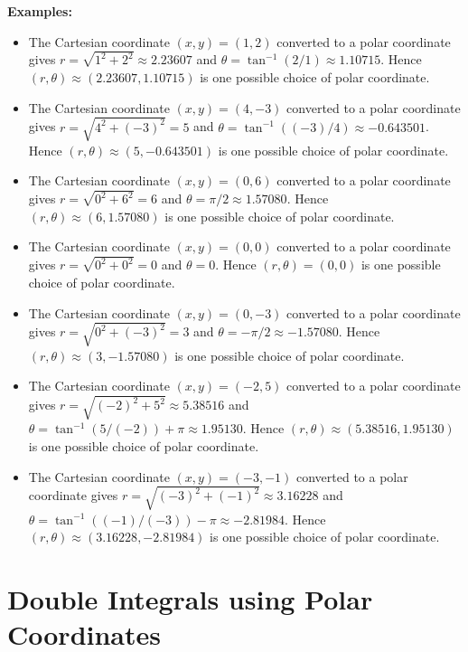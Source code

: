 \documentclass{article}
\begin{document}
\textbf{Examples:}
\begin{itemize}
\item The Cartesian coordinate \((x, y) = (1, 2)\) converted to a polar coordinate gives \(r = \sqrt{1^2 + 2^2} \approx 2.23607\) and \(\theta = \tan^{-1}(2/1) \approx 1.10715\). Hence \((r, \theta) \approx (2.23607, 1.10715)\) is one possible choice of polar coordinate. 
\item The Cartesian coordinate \((x, y) = (4, -3)\) converted to a polar coordinate gives \(r = \sqrt{4^2 + (-3)^2} = 5\) and \(\theta = \tan^{-1}((-3)/4) \approx -0.643501\). Hence \((r, \theta) \approx (5, -0.643501)\) is one possible choice of polar coordinate. 
\item The Cartesian coordinate \((x, y) = (0, 6)\) converted to a polar coordinate gives \(r = \sqrt{0^2 + 6^2} = 6\) and \(\theta = \pi/2 \approx 1.57080\). Hence \((r, \theta) \approx (6, 1.57080)\) is one possible choice of polar coordinate.  
\item The Cartesian coordinate \((x, y) = (0, 0)\) converted to a polar coordinate gives \(r = \sqrt{0^2 + 0^2} = 0\) and \(\theta = 0\). Hence \((r, \theta) = (0, 0)\) is one possible choice of polar coordinate.
\item The Cartesian coordinate \((x, y) = (0, -3)\) converted to a polar coordinate gives \(r = \sqrt{0^2 + (-3)^2} = 3\) and \(\theta = -\pi/2 \approx -1.57080\). Hence \((r, \theta) \approx (3, -1.57080)\) is one possible choice of polar coordinate.
\item The Cartesian coordinate \((x, y) = (-2, 5)\) converted to a polar coordinate gives \(r = \sqrt{(-2)^2 + 5^2} \approx 5.38516\) and \(\theta = \tan^{-1}(5/(-2)) + \pi \approx 1.95130\). Hence \((r, \theta) \approx (5.38516, 1.95130)\) is one possible choice of polar coordinate. 
\item The Cartesian coordinate \((x, y) = (-3, -1)\) converted to a polar coordinate gives \(r = \sqrt{(-3)^2 + (-1)^2} \approx 3.16228\) and \(\theta = \tan^{-1}((-1)/(-3)) - \pi \approx -2.81984\). Hence \((r, \theta) \approx (3.16228, -2.81984)\) is one possible choice of polar coordinate. 
\end{itemize}




\section*{Double Integrals using Polar Coordinates}
\end{document}
